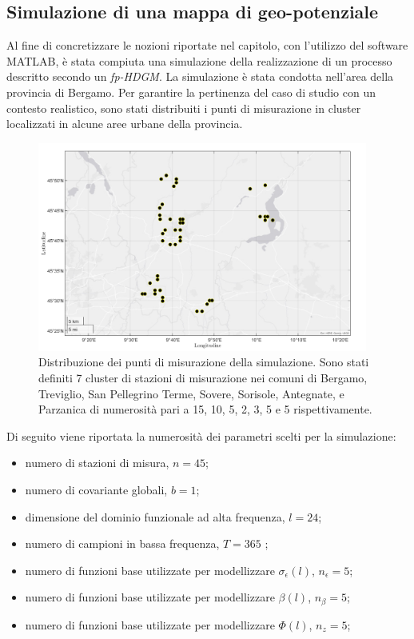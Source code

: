 \subsection[Simulazione di una mappa di geo-potenziale]{Simulazione di una mappa di geo-potenziale}
Al fine di concretizzare le nozioni riportate nel capitolo, con l'utilizzo del software MATLAB, è stata compiuta una simulazione della realizzazione di un processo descritto secondo un \textit{fp-HDGM}. La simulazione è stata condotta nell'area della provincia di Bergamo. Per garantire la pertinenza del caso di studio con un contesto realistico, sono stati distribuiti i punti di misurazione in cluster localizzati in alcune aree urbane della provincia. 
\begin{figure}[htp]
	\centering
	\includegraphics[height=260px]{Immagini/2. Nuovo modello/Mappa stazioni simulate_png}
	\caption[ Distribuzione dei punti di misurazione della simulazione.] {Distribuzione dei punti di misurazione della simulazione. Sono stati definiti 7 cluster di stazioni di misurazione nei comuni di Bergamo, Treviglio, San Pellegrino Terme, Sovere, Sorisole, Antegnate, e Parzanica di numerosità pari a 15, 10, 5, 2, 3, 5 e 5 rispettivamente.}
	\label{mappa_stazioni_simulate}
\end{figure}
Di seguito viene riportata la numerosità dei parametri scelti per la simulazione:
\begin{itemize}
	\item numero di stazioni di misura, $n=45$;
	\item numero di covariante globali, $b=1$;
	\item dimensione del dominio funzionale ad alta frequenza, $l=24$;
	\item numero di campioni in bassa frequenza, $T=365$ ;
	\item numero di funzioni base utilizzate per modellizzare  $\sigma_\epsilon (l)$,  $n_\epsilon =5$;
	\item numero di funzioni base utilizzate per modellizzare $\beta(l)$, $n_\beta=5$;
	\item numero di funzioni base utilizzate per modellizzare $\Phi(l)$, $n_z=5$;
\end{itemize}

